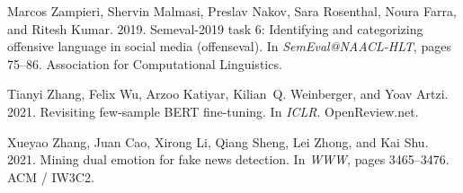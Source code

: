 \documentclass[11pt]{article}
\begin{document}
\begin{thebibliography}{31}
    Marcos Zampieri, Shervin Malmasi, Preslav Nakov, Sara Rosenthal, Noura Farra,
      and Ritesh Kumar. 2019.
    \newblock Semeval-2019 task 6: Identifying and categorizing offensive language
      in social media (offenseval).
    \newblock In \emph{SemEval@NAACL-HLT}, pages 75--86. Association for
      Computational Linguistics.
    
    Tianyi Zhang, Felix Wu, Arzoo Katiyar, Kilian~Q. Weinberger, and Yoav Artzi.
      2021{}.
    \newblock Revisiting few-sample {BERT} fine-tuning.
    \newblock In \emph{{ICLR}}. OpenReview.net.
    
    Xueyao Zhang, Juan Cao, Xirong Li, Qiang Sheng, Lei Zhong, and Kai Shu.
      2021{}.
    \newblock Mining dual emotion for fake news detection.
    \newblock In \emph{{WWW}}, pages 3465--3476. {ACM} / {IW3C2}.
    
    \end{thebibliography}
    
\end{document}
